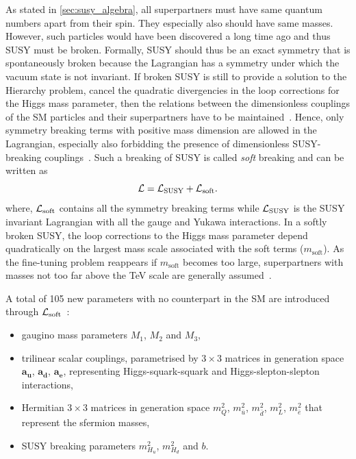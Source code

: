 As stated in \cref{sec:susy_algebra}, all superpartners must have same quantum numbers apart from their spin. They especially also should have same masses. However, such particles would have been discovered a long time ago and thus SUSY must be broken. Formally, SUSY should thus be an exact symmetry that is spontaneously broken because the Lagrangian has a symmetry under which the vacuum state is not invariant. If broken SUSY is still to provide a solution to the Hierarchy problem, \ie cancel the quadratic divergencies in the loop corrections for the Higgs mass parameter, then the relations between the dimensionless couplings of the SM particles and their superpartners have to be maintained~\cite{Martin:1997ns}. Hence, only symmetry breaking terms with positive mass dimension are allowed in the Lagrangian, especially also forbidding the presence of dimensionless SUSY-breaking couplings~\cite{Martin:1997ns}. Such a breaking of SUSY is called \textit{soft} breaking and can be written as
\begin{equation}
	\mathcal{L} = \mathcal{L}_\mathrm{SUSY} + \mathcal{L}_\mathrm{soft}.
\end{equation}
where, $\mathcal{L}_\mathrm{soft}$ contains all the symmetry breaking terms while $\mathcal{L}_\mathrm{SUSY}$ is the SUSY invariant Lagrangian with all the gauge and Yukawa interactions. In a softly broken SUSY, the loop corrections to the Higgs mass parameter depend quadratically on the largest mass scale associated with the soft terms ($m_\mathrm{soft}$). As the fine-tuning problem reappears if $m_\mathrm{soft}$ becomes too large, superpartners with masses not too far above the TeV scale are generally assumed~\cite{Martin:1997ns}.

A total of 105 new parameters with no counterpart in the SM are introduced through $\mathcal{L}_\mathrm{soft}$~\cite{Martin:1997ns,Dimopoulos:1995ju}:
\begin{itemize}
	\item gaugino mass parameters $M_1$, $M_2$ and $M_3$,
	\item trilinear scalar couplings, parametrised by $3\times 3$ matrices in generation space $\boldsymbol{a_u}$, $\boldsymbol{a_d}$, $\boldsymbol{a_e}$, representing Higgs-squark-squark and Higgs-slepton-slepton interactions,
	\item Hermitian $3\times 3$ matrices in generation space \boldmath $m_Q^2$, $m^2_{\bar{u}}$, $m^2_{\bar{d}}$, $m^2_L$, $m^2_{\bar{e}}$ \unboldmath that represent the sfermion masses,
	\item SUSY breaking parameters $m^2_{H_u}$, $m^2_{H_d}$ and $b$.
\end{itemize}

